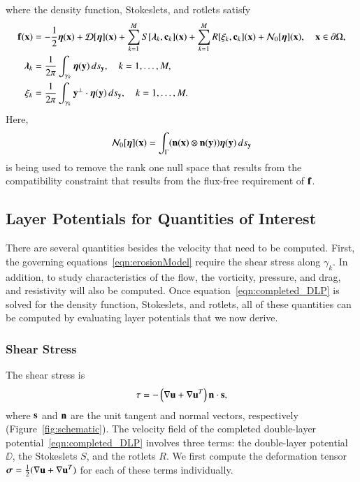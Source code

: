 \documentclass[preprint, 10pt]{elsarticle}
\begin{document}
where the density function, Stokeslets, and rotlets satisfy
\begin{subequations}
\label{eqn:completed_BIE}
\begin{align}
  \ff(\xx) &= -\frac{1}{2}\eeta(\xx) + \DD[\eeta](\xx) + 
      \sum_{k=1}^{M} S[\llambda_k,\cc_k](\xx) +
      \sum_{k=1}^{M} R[\xi_k,\cc_k](\xx) + \NN_0[\eeta](\xx),
      \quad \xx \in \bd\Omega, 
      \label{eqn:DLP}\\
  \llambda_k &= \frac{1}{2\pi}\int_{\gamma_k} \eeta(\yy) \, ds_\yy,
  \quad k=1,\ldots,M,
  \label{eqn:stokeslet} \\
  \xi_k &= \frac{1}{2\pi}\int_{\gamma_k} \yy^\perp \cdot \eeta(\yy)
  \, ds_\yy, \quad k=1,\ldots,M.
  \label{eqn:rotlet}
\end{align}
\end{subequations}
Here,
\begin{align*}
  \NN_0[\eeta](\xx) = \int_{\Gamma} 
    (\nn(\xx) \otimes \nn(\yy))\eeta(\yy) \, ds_\yy
\end{align*}
is being used to remove the rank one null space that results from the
compatibility constraint that results from the flux-free requirement of
$\ff$.


\subsection{Layer Potentials for Quantities of Interest}
\label{sec:qois}
There are several quantities besides the velocity that need to be
computed.  First, the governing equations~\eqref{eqn:erosionModel}
require the shear stress along $\gamma_k$.  In addition, to study
characteristics of the flow, the vorticity, pressure, and drag, and
resistivity will also be computed.  Once
equation~\eqref{eqn:completed_DLP} is solved for the density function,
Stokeslets, and rotlets, all of these quantities can be computed by
evaluating layer potentials that we now derive.

\subsubsection{Shear Stress}
The shear stress is
\begin{align*}
  \tau = -\left(\nabla \uu + \nabla \uu^T \right)\nn \cdot \ss,
\end{align*}
where $\ss$ and $\nn$ are the unit tangent and normal vectors,
respectively (Figure~\ref{fig:schematic}).  The velocity field of the
completed double-layer potential~\eqref{eqn:completed_DLP} involves
three terms: the double-layer potential $\DD$, the Stokeslets $S$, and
the rotlets $R$.  We first compute the deformation tensor $\ssigma =
\frac{1}{2}(\nabla\uu + \nabla\uu^T)$ for each of these terms
individually.
\end{document}
